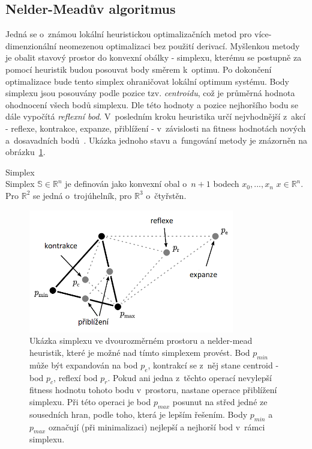 \subsection{Nelder-Meadův algoritmus}
Jedná se o~známou lokální heuristickou optimalizačních metod pro více-dimenzionální neomezenou optimalizaci bez použití derivací. Myšlenkou metody je obalit stavový prostor do konvexní obálky - simplexu, kterému se postupně za pomocí heuristik budou posouvat body směrem k~optimu. Po dokončení optimalizace bude tento simplex ohraničovat lokální optimum systému. Body simplexu jsou posouvány podle pozice tzv. \textit{centroidu}, což je průměrná hodnota ohodnocení všech bodů simplexu. Dle této hodnoty a pozice nejhoršího bodu se dále vypočítá \textit{reflexní bod}. V~posledním kroku heuristika určí nejvhodnější z~akcí - reflexe, kontrakce, expanze, přiblížení - v~závislosti na fitness hodnotách nových a~dosavadních bodů~\cite{EVO}. Ukázka jednoho stavu a~fungování metody je znázorněn na obrázku~\ref{fg:nm}.

\begin{definition} {Simplex\\}
Simplex \(\mathbb{S} \in \mathbb{R}^n\) je definován jako konvexní obal o~\(n+1\) bodech \(x_0, ..., x_n\) \(x \in \mathbb{R}^n\). Pro \(\mathbb{R}^2\) se jedná o~trojúhelník, pro \(\mathbb{R}^3\) o~čtyřstěn.
\label{def:simplex}
\end{definition}

\begin{figure}[hbt]
	\centering
	\includegraphics[width=0.8\textwidth]{obrazky-figures/nelderMead.png}
	\caption{Ukázka simplexu ve dvourozměrném prostoru a nelder-mead heuristik, které je možné nad tímto simplexem provést. Bod $p_{min}$ může být expandován na bod $p_e$, kontrakcí se z~něj stane centroid - bod $p_c$, reflexí bod $p_r$. Pokud ani jedna z~těchto operací nevylepší fitness hodnotu tohoto bodu v~prostoru, nastane operace přiblížení simplexu. Při této operaci je bod $p_{max}$ posunut na střed jedné ze sousedních hran, podle toho, která je lepším řešením. Body $p_{min}$ a $p_{max}$ označují (při minimalizaci) nejlepší a nejhorší bod v~rámci simplexu.}
	\label{fg:nm}
\end{figure}

